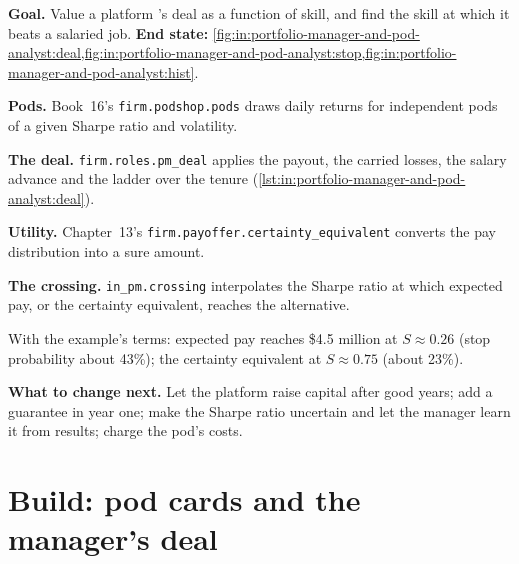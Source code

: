 \begin{tutorial}
\textbf{Goal.} Value a platform 's deal as a function of skill, and find the skill at which it beats a
salaried job.
\textbf{End state:} \cref{fig:in:portfolio-manager-and-pod-analyst:deal,fig:in:portfolio-manager-and-pod-analyst:stop,fig:in:portfolio-manager-and-pod-analyst:hist}.
\begin{tutsteps}
\item \textbf{Pods.} Book~16's \texttt{firm.podshop.pods} draws daily returns for independent pods of a given Sharpe
ratio and volatility.
\item \textbf{The deal.} \texttt{firm.roles.pm\_deal} applies the payout, the carried losses, the salary advance and the
ladder over the tenure (\cref{lst:in:portfolio-manager-and-pod-analyst:deal}).
\label{lst:in:portfolio-manager-and-pod-analyst:deal}
\item \textbf{Utility.} Chapter~13's \texttt{firm.payoffer.certainty\_equivalent} converts the pay distribution into a
sure amount.
\item \textbf{The crossing.} \texttt{in\_pm.crossing} interpolates the Sharpe ratio at which expected pay, or the
certainty equivalent, reaches the alternative.
\end{tutsteps}
\end{tutorial}

With the example's terms: expected pay reaches \$4.5 million at $S\approx0.26$ (stop probability about 43\%); the
certainty equivalent at $S\approx0.75$ (about 23\%).

\textbf{What to change next.} Let the platform raise capital after good years; add a guarantee in year one; make the
Sharpe ratio uncertain and let the manager learn it from results; charge the pod's costs.

\section{Build: pod cards and the manager's deal}\label{bld:in:portfolio-manager-and-pod-analyst:roles}

